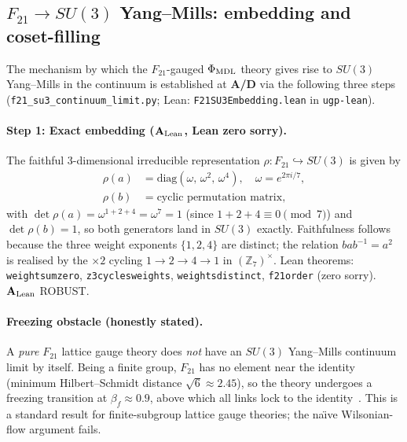 \documentclass[11pt]{article}
\theoremstyle{remark}
\newcommand{\phimdl}{\Phi_{\rm MDL}}
\newcommand{\Ftwentyone}{F_{21}}
\newcommand{\lean}[1]{%
  \penalty-100
  \begingroup\def\_{\textunderscore\allowbreak}\texttt{#1}\endgroup}
\newcommand{\CatAL}{\ensuremath{\textbf{A}_{\rm Lean}}}
\newcommand{\CatAD}{\textbf{A/D}}
\begin{document}
\subsection{$\Ftwentyone \to SU(3)$ Yang--Mills: embedding and coset-filling}
\label{ssec:uvconjecture}

The mechanism by which the $\Ftwentyone$-gauged $\phimdl$ theory gives rise to
$SU(3)$ Yang--Mills in the continuum is established at \CatAD{} via the following
three steps (\texttt{f21\_su3\_continuum\_limit.py};
Lean: \texttt{F21SU3Embedding.lean} in \texttt{ugp-lean}).

\paragraph{Step 1: Exact embedding (\CatAL{}, Lean zero sorry).}
The faithful 3-dimensional irreducible representation
$\rho: \Ftwentyone \hookrightarrow SU(3)$ is given by
\begin{align}
  \rho(a) &= \mathrm{diag}(\omega,\,\omega^2,\,\omega^4), \quad \omega = e^{2\pi i/7}, \\
  \rho(b) &= \text{cyclic permutation matrix},
\end{align}
with $\det\rho(a) = \omega^{1+2+4} = \omega^7 = 1$ (since $1+2+4 \equiv 0 \pmod{7}$)
and $\det\rho(b) = 1$, so both generators land in $SU(3)$ exactly.
Faithfulness follows because the three weight exponents $\{1,2,4\}$ are distinct;
the relation $bab^{-1}=a^2$ is realised by the $\times 2$ cycling $1\!\to\!2\!\to\!4\!\to\!1$
in $(\mathbb{Z}_7)^\times$.
Lean theorems: \lean{weight\_sum\_zero}, \lean{z3\_cycles\_weights},
\lean{weights\_distinct}, \lean{f21\_order} (zero sorry). \CatAL{} ROBUST.

\paragraph{Freezing obstacle (honestly stated).}
A \emph{pure} $\Ftwentyone$ lattice gauge theory does \emph{not} have an $SU(3)$
Yang--Mills continuum limit by itself.  Being a finite group, $\Ftwentyone$ has no
element near the identity (minimum Hilbert--Schmidt distance $\sqrt{6}\approx 2.45$),
so the theory undergoes a freezing transition at $\beta_f \approx 0.9$, above which
all links lock to the identity~\cite{BhanotRebbi1981,Rebbi1980,PetcWein1980}.
This is a standard result for finite-subgroup lattice gauge theories; the
na\"{\i}ve Wilsonian-flow argument fails.
\end{document}
